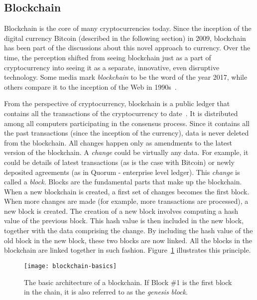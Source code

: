 \subsection{Blockchain}
% 
Blockchain is the core of many cryptocurrencies today. Since the inception of the digital currency Bitcoin (described in the following section) in 2009, blockchain has been part of the discussions about this novel approach to currency. Over the time, the perception shifted from seeing blockchain just as a part of cryptocurrency into seeing it as a separate, innovative, even disruptive technology. Some media mark \textit{blockchain} to be the word of the year 2017\footnotemark, while others compare it to the inception of the Web in 1990s~\cite[p. 14]{Swan2015BlockchainEconomy}.
% 

From the perspective of cryptocurrency, blockchain is a public ledger that contains all the transactions of the cryptocurrency to date~\cite{Swan2015BlockchainEconomy}. It is distributed among all computers participating in the consensus process. Since it contains all the past transactions (since the inception of the currency), data is never deleted from the blockchain. All changes happen only as amendments to the latest version of the blockchain. A \textit{change} could be virtually any data. For example, it could be details of latest transactions (as is the case with Bitcoin) or newly deposited agreements (as in Quorum - enterprise level ledger\footnotemark). This \textit{change} is called a \textit{block}. Blocks are the fundamental parts that make up the blockchain. When a new blockchain is created, a first set of changes becomes the first block.
% 
% 
When more changes are made (for example, more transactions are processed), a new block is created. The creation of a new block involves computing a hash value of the previous block. This hash value is then included in the new block, together with the data comprising the change. By including the hash value of the old block in the new block, these two blocks are now linked. All the blocks in the blockchain are linked together in such fashion. Figure~\ref{fig:blockch-basics} illustrates this principle. 
% 
\begin{figure}[ht]
    \centering
    \texttt{[image: blockchain-basics]}
    \caption{The basic architecture of a blockchain. If Block \#1 is the first block in the chain, it is also referred to as the \textit{genesis block}.}
    \label{fig:blockch-basics}
\end{figure}

